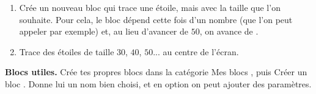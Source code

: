 \documentclass[class=report,crop=false, 12pt]{standalone}
\begin{document}
\begin{activite}
\begin{enumerate}
  \item Crée un nouveau bloc  qui trace une étoile, mais avec la taille que l'on souhaite. Pour cela, le bloc dépend cette fois d'un nombre (que l'on peut appeler  par exemple) et, au lieu d'avancer de $50$, on avance de .
  
  \item Trace des étoiles de taille $30$, $40$, $50$... au centre de l'écran.
\end{enumerate}

\bigskip

\textbf{Blocs utiles.}
Crée tes propres blocs dans la catégorie \og Mes blocs \fg{}, puis \og Créer un bloc \fg{}. Donne lui un nom bien choisi, et en option on peut ajouter des paramètres.  

\begin{center}
\begin{scratch}
\end{scratch}\qquad
\begin{scratch}
\end{scratch}
\end{center}

\end{activite}
\end{document}
